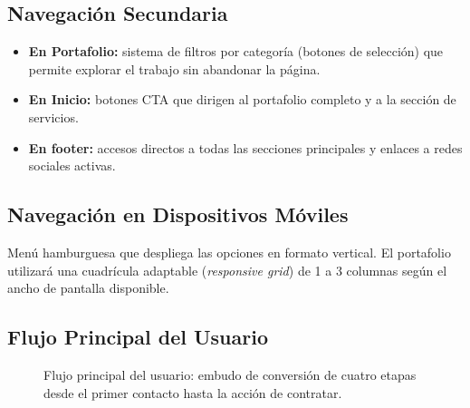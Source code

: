 \documentclass[12pt, letterpaper]{article}
\begin{document}
\subsection{Navegación Secundaria}

\begin{itemize}
  \item \textbf{En Portafolio:} sistema de filtros por categoría (botones de selección) que permite explorar el trabajo sin abandonar la página.
  \item \textbf{En Inicio:} botones CTA que dirigen al portafolio completo y a la sección de servicios.
  \item \textbf{En footer:} accesos directos a todas las secciones principales y enlaces a redes sociales activas.
\end{itemize}

\subsection{Navegación en Dispositivos Móviles}

Menú hamburguesa que despliega las opciones en formato vertical. El portafolio utilizará una cuadrícula adaptable (\textit{responsive grid}) de 1 a 3 columnas según el ancho de pantalla disponible.

\subsection{Flujo Principal del Usuario}

\vspace{8pt}
\begin{figure}[H]
\centering
{}
\caption{Flujo principal del usuario: embudo de conversión de cuatro etapas desde el primer contacto hasta la acción de contratar.}
\label{fig:flujo-usuario}
\end{figure}
\vspace{4pt}
\end{document}
